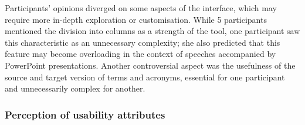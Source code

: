 Participants’ opinions diverged on some aspects of the interface, which may require more in-depth exploration or customisation. While 5 participants mentioned the division into columns as a strength of the tool, one participant saw this characteristic as an unnecessary complexity; she also predicted that this feature may become overloading in the context of speeches accompanied by PowerPoint presentations. Another controversial aspect was the usefulness of the source and target version of terms and acronyms, essential for one participant and unnecessarily complex for another.

\subsubsection{Perception of usability attributes}


